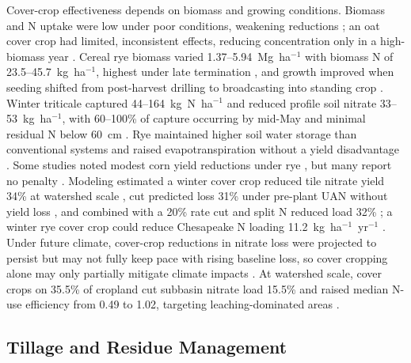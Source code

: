 \documentclass[11pt]{article}
\begin{document}
Cover-crop effectiveness depends on biomass and growing conditions. Biomass and N uptake were low under poor conditions, weakening reductions \parencite{PrezaFontes2021}; an oat cover crop had limited, inconsistent effects, reducing concentration only in a high-biomass year \parencite{OBrien2022}. Cereal rye biomass varied 1.37--5.94~Mg~ha$^{-1}$ with biomass N of 23.5--45.7~kg~ha$^{-1}$, highest under late termination \parencite{Gentry2025}, and growth improved when seeding shifted from post-harvest drilling to broadcasting into standing crop \parencite{Waring2024}. Winter triticale captured 44--164~kg~N~ha$^{-1}$ and reduced profile soil nitrate 33--53~kg~ha$^{-1}$, with 60--100\% of capture occurring by mid-May and minimal residual N below 60~cm \parencite{Nance2007}. Rye maintained higher soil water storage than conventional systems and raised evapotranspiration without a yield disadvantage \parencite{Qi2011}. Some studies noted modest corn yield reductions under rye \parencite{Ruffatti2019,Dougherty2020}, but many report no penalty \parencite{OBrien2022,PrezaFontes2021,Gentry2025}. Modeling estimated a winter cover crop reduced tile nitrate yield 34\% at watershed scale \parencite{David2015}, cut predicted loss 31\% under pre-plant UAN without yield loss \parencite{Malone2007b}, and combined with a 20\% rate cut and split N reduced load 32\% \parencite{Singh2023}; a winter rye cover crop could reduce Chesapeake N loading 11.2~kg~ha$^{-1}$~yr$^{-1}$ \parencite{Woodbury2018}. Under future climate, cover-crop reductions in nitrate loss were projected to persist but may not fully keep pace with rising baseline loss, so cover cropping alone may only partially mitigate climate impacts \parencite{Gupta2023}. At watershed scale, cover crops on 35.5\% of cropland cut subbasin nitrate load 15.5\% and raised median N-use efficiency from 0.49 to 1.02, targeting leaching-dominated areas \parencite{Makhtoumi2025}.

\subsection{Tillage and Residue Management}
\end{document}
